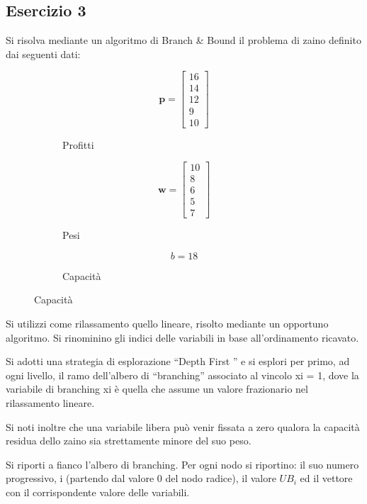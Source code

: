 \documentclass[\main/main.tex]{subfiles}
\begin{document}
\subsection{Esercizio 3}

Si risolva mediante un algoritmo di Branch \& Bound il problema di zaino definito dai seguenti dati:

\begin{figure}
  \begin{subfigure}{0.31\textwidth}
    \[
      \bm{p} = \begin{bmatrix}
        16 \\
        14 \\
        12 \\
        9  \\
        10
      \end{bmatrix}
    \]
    \caption{Profitti}
  \end{subfigure}
  \begin{subfigure}{0.31\textwidth}
    \[
      \bm{w} = \begin{bmatrix}
        10 \\
        8  \\
        6  \\
        5  \\
        7
      \end{bmatrix}
    \]
    \caption{Pesi}
  \end{subfigure}
  \begin{subfigure}{0.31\textwidth}
    \[
      b = 18
    \]
    \caption{Capacità}
  \end{subfigure}
\end{figure}

Si utilizzi come rilassamento quello lineare, risolto mediante un opportuno algoritmo. Si rinominino gli indici delle variabili in base all’ordinamento ricavato.

Si adotti una strategia di esplorazione “Depth First ” e si esplori per primo, ad ogni livello, il ramo dell’albero di “branching” associato al vincolo xi = 1, dove la variabile di branching xi è quella che assume un valore frazionario nel rilassamento lineare.

Si noti inoltre che una variabile libera può venir fissata a zero qualora la capacità residua dello zaino sia strettamente minore del suo peso.

Si riporti a fianco l'albero di branching. Per ogni nodo si riportino: il suo numero progressivo, i (partendo dal valore 0 del nodo radice), il valore $UB_i$ ed il vettore con il corrispondente valore delle variabili.
\end{document}
